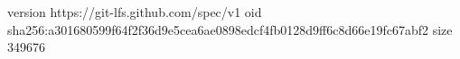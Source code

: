 version https://git-lfs.github.com/spec/v1
oid sha256:a301680599f64f2f36d9e5cea6ae0898edcf4fb0128d9ff6c8d66e19fc67abf2
size 349676
